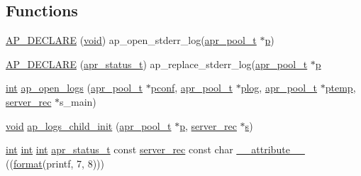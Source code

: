 \subsection*{Functions}
\begin{DoxyCompactItemize}
\item 
\hyperlink{group__APACHE__CORE__LOG_ga7983b940b78ab08d31d0a7d4fa92ed3b}{A\+P\+\_\+\+D\+E\+C\+L\+A\+RE} (\hyperlink{group__MOD__ISAPI_gacd6cdbf73df3d9eed42fa493d9b621a6}{void}) ap\+\_\+open\+\_\+stderr\+\_\+log(\hyperlink{structapr__pool__t}{apr\+\_\+pool\+\_\+t} $\ast$\hyperlink{group__APACHE__CORE__MPM_ga5cd91701e5c167f2b1a38e70ab57817e}{p})
\item 
\hyperlink{group__APACHE__CORE__LOG_ga319d9a68485463642109c701e1c06de4}{A\+P\+\_\+\+D\+E\+C\+L\+A\+RE} (\hyperlink{group__apr__errno_gaa5105fa83cc322f09382292db8b47593}{apr\+\_\+status\+\_\+t}) ap\+\_\+replace\+\_\+stderr\+\_\+log(\hyperlink{structapr__pool__t}{apr\+\_\+pool\+\_\+t} $\ast$\hyperlink{group__APACHE__CORE__MPM_ga5cd91701e5c167f2b1a38e70ab57817e}{p}
\item 
\hyperlink{pcre_8txt_a42dfa4ff673c82d8efe7144098fbc198}{int} \hyperlink{group__APACHE__CORE__LOG_gac08123bb03c21f9c22d93856b0063393}{ap\+\_\+open\+\_\+logs} (\hyperlink{structapr__pool__t}{apr\+\_\+pool\+\_\+t} $\ast$\hyperlink{group__APACHE__CORE__CONFIG_gade454c9a3dc13ac389d15bf30f6c92b2}{pconf}, \hyperlink{structapr__pool__t}{apr\+\_\+pool\+\_\+t} $\ast$\hyperlink{group__APACHE__CORE__CONFIG_gaa034d01ac4c0f083d21feaeae4e9c860}{plog}, \hyperlink{structapr__pool__t}{apr\+\_\+pool\+\_\+t} $\ast$\hyperlink{group__APACHE__CORE__CONFIG_ga276c3069e6bb618213a277e21f6f269e}{ptemp}, \hyperlink{structserver__rec}{server\+\_\+rec} $\ast$s\+\_\+main)
\item 
\hyperlink{group__MOD__ISAPI_gacd6cdbf73df3d9eed42fa493d9b621a6}{void} \hyperlink{group__APACHE__CORE__LOG_gaafc5404fc9f6c5750de9ec57b8223b1d}{ap\+\_\+logs\+\_\+child\+\_\+init} (\hyperlink{structapr__pool__t}{apr\+\_\+pool\+\_\+t} $\ast$\hyperlink{group__APACHE__CORE__MPM_ga5cd91701e5c167f2b1a38e70ab57817e}{p}, \hyperlink{structserver__rec}{server\+\_\+rec} $\ast$\hyperlink{pcretest_8txt_a062597889ba244b72877454b1d3adecf}{s})
\item 
\hyperlink{pcre_8txt_a42dfa4ff673c82d8efe7144098fbc198}{int} \hyperlink{pcre_8txt_a42dfa4ff673c82d8efe7144098fbc198}{int} \hyperlink{pcre_8txt_a42dfa4ff673c82d8efe7144098fbc198}{int} \hyperlink{group__apr__errno_gaa5105fa83cc322f09382292db8b47593}{apr\+\_\+status\+\_\+t} const \hyperlink{structserver__rec}{server\+\_\+rec} const char \hyperlink{group__APACHE__CORE__LOG_ga3b3f03801dc9e2602b5a33f6f30df470}{\+\_\+\+\_\+attribute\+\_\+\+\_\+} ((\hyperlink{group__apr__time_ga6427c3237144d9709aa13825289f0b78}{format}(printf, 7, 8)))

\end{DoxyCompactItemize}

